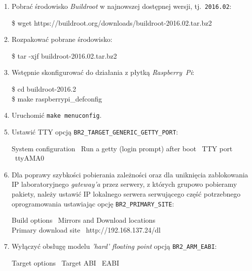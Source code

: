 \documentclass{article}
\newenvironment{ttblock}{\ttfamily}{\par}
\begin{document}
\begin{enumerate}
\item Pobrać środowisko \emph{Buildroot} w najnowszej dostępnej wersji, tj.~\texttt{2016.02}:

\begin{ttblock}
\$ wget https://buildroot.org/downloads/buildroot-2016.02.tar.bz2
\end{ttblock}

\item Rozpakować pobrane środowisko:

\begin{ttblock}
\$ tar -xjf buildroot-2016.02.tar.bz2
\end{ttblock}

\item Wstępnie skonfigurować do działania z płytką \emph{Raspberry~Pi}:

\begin{ttblock}
\$ cd buildroot-2016.2\\
\$ make raspberrypi\_defconfig
\end{ttblock}

\item Uruchomić \texttt{make menuconfig}.

\item Ustawić TTY opcją \texttt{BR2\_TARGET\_GENERIC\_GETTY\_PORT}:

\begin{ttblock}
System configuration \textrightarrow\ Run a getty (login prompt) after boot \textrightarrow\ TTY port \textrightarrow\ ttyAMA0
\end{ttblock}

\item Dla poprawy szybkości pobierania zależności oraz dla uniknięcia zablokowania IP laboratoryjnego \emph{gateway'a} przez serwery, z których grupowo pobieramy pakiety, należy ustawić IP lokalnego serwera serwującego część potrzebnego oprogramowania ustawiając opcję \texttt{BR2\_PRIMARY\_SITE}:

\begin{ttblock}
Build options \textrightarrow\ Mirrors and Download locations \textrightarrow\\Primary download site \textrightarrow\ http://192.168.137.24/dl
\end{ttblock}

\item Wyłączyć obsługę modelu \emph{'hard' floating point} opcją \texttt{BR2\_ARM\_EABI}:

\begin{ttblock}
Target options \textrightarrow\ Target ABI \textrightarrow\ EABI
\end{ttblock}


\end{enumerate}
\end{document}
